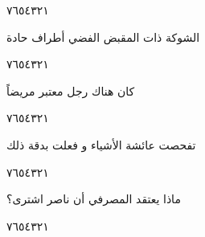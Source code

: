 \documentclass[11pt, a4paper]{article}
\begin{document}
{\begin{center}
        \hfill\textarabic{٧}\hfill\textarabic{٦}\hfill\textarabic{٥}\hfill\textarabic{٤}\hfill\textarabic{٣}\hfill\textarabic{٢}\hfill\textarabic{١}
        \end{center}


\vspace{0.5\baselineskip}\begin{flushright}
\textarabic{الشوكة ذات المقبض الفضي أطراف حادة}
\end{flushright}

\begin{center}
        \hfill\textarabic{٧}\hfill\textarabic{٦}\hfill\textarabic{٥}\hfill\textarabic{٤}\hfill\textarabic{٣}\hfill\textarabic{٢}\hfill\textarabic{١}
        \end{center}


\vspace{0.5\baselineskip}\begin{flushright}
\textarabic{كان هناك رجل معتبر مريضاً}
\end{flushright}

\begin{center}
        \hfill\textarabic{٧}\hfill\textarabic{٦}\hfill\textarabic{٥}\hfill\textarabic{٤}\hfill\textarabic{٣}\hfill\textarabic{٢}\hfill\textarabic{١}
        \end{center}


\vspace{0.5\baselineskip}\begin{flushright}
\textarabic{تفحصت عائشة الأشياء و فعلت بدقة ذلك}
\end{flushright}

\begin{center}
        \hfill\textarabic{٧}\hfill\textarabic{٦}\hfill\textarabic{٥}\hfill\textarabic{٤}\hfill\textarabic{٣}\hfill\textarabic{٢}\hfill\textarabic{١}
        \end{center}


\vspace{0.5\baselineskip}\begin{flushright}
\textarabic{ماذا يعتقد المصرفي أن ناصر اشترى؟}
\end{flushright}

\begin{center}
        \hfill\textarabic{٧}\hfill\textarabic{٦}\hfill\textarabic{٥}\hfill\textarabic{٤}\hfill\textarabic{٣}\hfill\textarabic{٢}\hfill\textarabic{١}
        \end{center}


}
\end{document}
